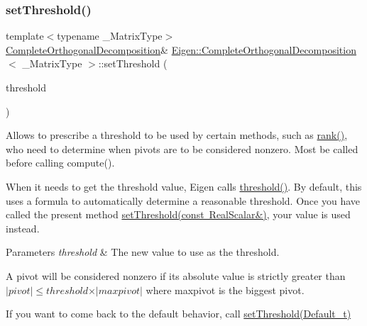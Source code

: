 \subsubsection{\texorpdfstring{setThreshold()}{setThreshold()}\hspace{0.1cm}{\footnotesize\ttfamily [1/2]}}
{\footnotesize\ttfamily template$<$typename \+\_\+\+Matrix\+Type$>$ \\
\mbox{\hyperlink{class_eigen_1_1_complete_orthogonal_decomposition}{Complete\+Orthogonal\+Decomposition}}\& \mbox{\hyperlink{class_eigen_1_1_complete_orthogonal_decomposition}{Eigen\+::\+Complete\+Orthogonal\+Decomposition}}$<$ \+\_\+\+Matrix\+Type $>$\+::set\+Threshold (\begin{DoxyParamCaption}\item[{const Real\+Scalar \&}]{threshold }\end{DoxyParamCaption})\hspace{0.3cm}{\ttfamily [inline]}}

Allows to prescribe a threshold to be used by certain methods, such as \mbox{\hyperlink{class_eigen_1_1_complete_orthogonal_decomposition_af348f64b26f8467a020062c22b748806}{rank()}}, who need to determine when pivots are to be considered nonzero. Most be called before calling compute().

When it needs to get the threshold value, Eigen calls \mbox{\hyperlink{class_eigen_1_1_complete_orthogonal_decomposition_a3909f07268496c0f08f1b57331d91075}{threshold()}}. By default, this uses a formula to automatically determine a reasonable threshold. Once you have called the present method \mbox{\hyperlink{class_eigen_1_1_complete_orthogonal_decomposition_aa9c9f7cbde9d58ca5552381b70ad8d82}{set\+Threshold(const Real\+Scalar\&)}}, your value is used instead.


\begin{DoxyParams}{Parameters}
{\em threshold} & The new value to use as the threshold.\\
\hline
\end{DoxyParams}
A pivot will be considered nonzero if its absolute value is strictly greater than $ \vert pivot \vert \leqslant threshold \times \vert maxpivot \vert $ where maxpivot is the biggest pivot.

If you want to come back to the default behavior, call \mbox{\hyperlink{class_eigen_1_1_complete_orthogonal_decomposition_a27c8da71874be7a64d6723bd0cae9f4f}{set\+Threshold(\+Default\+\_\+t)}} \mbox{\label{class_eigen_1_1_complete_orthogonal_decomposition_a27c8da71874be7a64d6723bd0cae9f4f}} 
